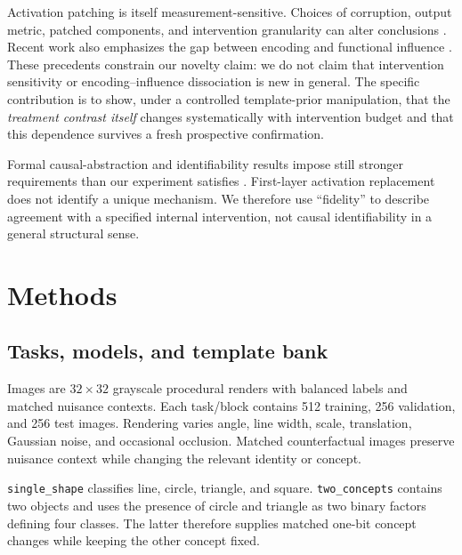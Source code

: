 \documentclass[10pt]{article}
\begin{document}
Activation patching is itself measurement-sensitive. Choices of corruption, output metric, patched components, and intervention granularity can alter conclusions \citep{zhang_2024_activation-patching,heimersheim_2024_activation-patching,miller_2024_circuit-faithfulness}. Recent work also emphasizes the gap between encoding and functional influence \citep{nicolson_2025_explaining-explainability,sharma_2026_encoding-without-influence}. These precedents constrain our novelty claim: we do not claim that intervention sensitivity or encoding--influence dissociation is new in general. The specific contribution is to show, under a controlled template-prior manipulation, that the \emph{treatment contrast itself} changes systematically with intervention budget and that this dependence survives a fresh prospective confirmation.

Formal causal-abstraction and identifiability results impose still stronger requirements than our experiment satisfies \citep{geiger_2025_causal-abstraction,meloux_2025_mechanistic-identifiability,sutter_2025_causal-abstraction-limits}. First-layer activation replacement does not identify a unique mechanism. We therefore use ``fidelity'' to describe agreement with a specified internal intervention, not causal identifiability in a general structural sense.

\section{Methods}\label{sec:methods}

\subsection{Tasks, models, and template bank}\label{sec:tasks-models}

Images are $32\times32$ grayscale procedural renders with balanced labels and matched nuisance contexts. Each task/block contains 512 training, 256 validation, and 256 test images. Rendering varies angle, line width, scale, translation, Gaussian noise, and occasional occlusion. Matched counterfactual images preserve nuisance context while changing the relevant identity or concept.

\texttt{single\_shape} classifies line, circle, triangle, and square. \texttt{two\_concepts} contains two objects and uses the presence of circle and triangle as two binary factors defining four classes. The latter therefore supplies matched one-bit concept changes while keeping the other concept fixed.
\end{document}

